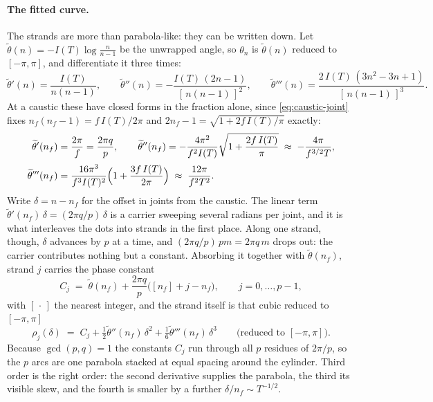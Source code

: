 \documentclass[11pt]{article}
\theoremstyle{definition}
\begin{document}
\paragraph{The fitted curve.} The strands are more than parabola-like: they can
be written down. Let $\widetilde\theta(n)=-I(T)\log\frac{n}{n-1}$ be the
unwrapped angle, so $\theta_n$ is $\widetilde\theta(n)$ reduced to
$[-\pi,\pi]$, and
differentiate it three times:
\begin{equation}\label{eq:jangle-derivs}
\widetilde\theta'(n)=\frac{I(T)}{n(n-1)},\qquad
\widetilde\theta''(n)=-\frac{I(T)\,(2n-1)}{[\,n(n-1)\,]^{2}},\qquad
\widetilde\theta'''(n)=\frac{2\,I(T)\,(3n^{2}-3n+1)}{[\,n(n-1)\,]^{3}}.
\end{equation}
At a caustic these have closed forms in the fraction alone, since
\eqref{eq:caustic-joint} fixes $n_f(n_f-1)=f\,I(T)/2\pi$ and
$2n_f-1=\sqrt{1+2f\,I(T)/\pi}$ exactly:
\begin{equation}\label{eq:caustic-derivs}
\begin{aligned}
\widetilde\theta'(n_f)&=\frac{2\pi}{f}=\frac{2\pi q}{p},
\qquad
\widetilde\theta''(n_f)=-\frac{4\pi^{2}}{f^{2}I(T)}
\sqrt{1+\frac{2f\,I(T)}{\pi}}\;\approx\;-\frac{4\pi}{f^{3/2}T},\\[2pt]
\widetilde\theta'''(n_f)&=\frac{16\pi^{3}}{f^{3}I(T)^{2}}
\Bigl(1+\frac{3f\,I(T)}{2\pi}\Bigr)\;\approx\;\frac{12\pi}{f^{2}T^{2}}.
\end{aligned}
\end{equation}
Write $\delta=n-n_f$ for the offset in joints from the caustic. The linear term
$\widetilde\theta'(n_f)\,\delta=(2\pi q/p)\,\delta$ is a carrier sweeping several
radians per joint, and it is what interleaves the dots into strands in the first
place. Along one strand, though, $\delta$ advances by $p$ at a time, and
$(2\pi q/p)\,pm=2\pi q\,m$ drops out: the carrier contributes nothing but a
constant. Absorbing it together with $\widetilde\theta(n_f)$, strand $j$ carries
the phase constant
\begin{equation}\label{eq:caustic-Cj}
C_j\;=\;\widetilde\theta(n_f)+\frac{2\pi q}{p}\bigl([n_f]+j-n_f\bigr),
\qquad j=0,\dots,p-1,
\end{equation}
with $[\,\cdot\,]$ the nearest integer, and the strand itself is that cubic
reduced to $[-\pi,\pi]$
\begin{equation}\label{eq:fitted-arc}
\rho_j(\delta)\;=\; C_j
+\tfrac12\widetilde\theta''(n_f)\,\delta^{2}
+\tfrac16\widetilde\theta'''(n_f)\,\delta^{3}
\qquad\text{(reduced to $[-\pi,\pi]$)}.
\end{equation}
Because $\gcd(p,q)=1$ the constants $C_j$ run through all $p$ residues of
$2\pi/p$, so the $p$ arcs are one parabola stacked at equal spacing around the
cylinder. Third order is the right order: the second derivative supplies the
parabola, the third its visible skew, and the fourth is smaller by a further
$\delta/n_f\sim T^{-1/2}$.
\end{document}
